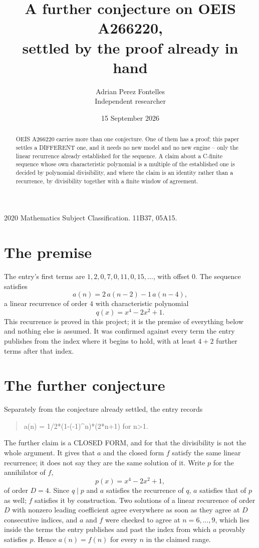 \documentclass[11pt,a4paper]{article}
\title{A further conjecture on OEIS A266220,\\ \large settled by the proof already in hand}
\author{Adrian Perez Fontelles\\ \small Independent researcher}
\date{15 September 2026}
\theoremstyle{plain}
\theoremstyle{definition}
\begin{document}
\maketitle

\begin{abstract}
OEIS A266220 carries more than one conjecture. One of them has a proof; this paper settles a
DIFFERENT one, and it needs no new model and no new engine -- only the linear recurrence already
established for the sequence. A claim about a C-finite sequence whose own characteristic
polynomial is a multiple of the established one is decided by polynomial divisibility, and where
the claim is an identity rather than a recurrence, by divisibility together with a finite window
of agreement.
\end{abstract}

\noindent\small 2020 Mathematics Subject Classification. 11B37, 05A15.\normalsize

\section{The premise}

The entry's first terms are $1, 2, 0, 7, 0, 11, 0, 15,\dots$, with offset $0$. The sequence satisfies
\[
  a(n)=2\,a(n-2) - 1\,a(n-4) ,
\]
a linear recurrence of order $4$ with characteristic polynomial
\[
  q(x)=x^{4} - 2 x^{2} + 1 .
\]
This recurrence is proved in this project; it is the premise of everything below and nothing else is assumed.
It was confirmed against every term the entry publishes from the index where it begins to hold,
with at least $4+2$ further terms after that index.

\section{The further conjecture}

Separately from the conjecture already settled, the entry records

\begin{quote}\raggedright a(n) = 1/2*(1-(-1)\^{}n)*(2*n+1) for n>1.\end{quote}

The further claim is a CLOSED FORM, and for that the divisibility is not the whole argument. It
gives that $a$ and the closed form $f$ satisfy the same linear recurrence; it does not say they
are the same solution of it. Write $p$ for the annihilator of $f$,
\[
  p(x)=x^{4} - 2 x^{2} + 1 ,
\]
of order $D=4$. Since $q\mid p$ and $a$ satisfies the recurrence of $q$, $a$ satisfies that of
$p$ as well; $f$ satisfies it by construction. Two solutions of a linear recurrence of order $D$
with nonzero leading coefficient agree everywhere as soon as they agree at $D$ consecutive
indices, and $a$ and $f$ were checked to agree at $n=6,\dots,9$,
which lies inside the terms the entry publishes and past the index from which $a$ provably
satisfies $p$. Hence $a(n)=f(n)$ for every $n$ in the claimed range.
\end{document}
